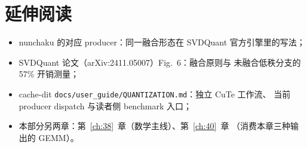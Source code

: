 \section*{延伸阅读}

\begin{itemize}[itemsep=1pt,topsep=2pt]
  \item nunchaku 的对应 producer：同一融合形态在 SVDQuant 官方引擎里的写法；
  \item SVDQuant 论文（arXiv:2411.05007）Fig.~6：融合原则与
        未融合低秩分支的 57\% 开销测量；
  \item cache-dit \texttt{docs/user\_guide/QUANTIZATION.md}：独立 CuTe 工作流、
        当前 producer dispatch 与读者侧 benchmark 入口；
  \item 本部分另两章：第~\ref{ch:38}~章（数学主线）、第~\ref{ch:40}~章
        （消费本章三种输出的 GEMM）。
\end{itemize}
